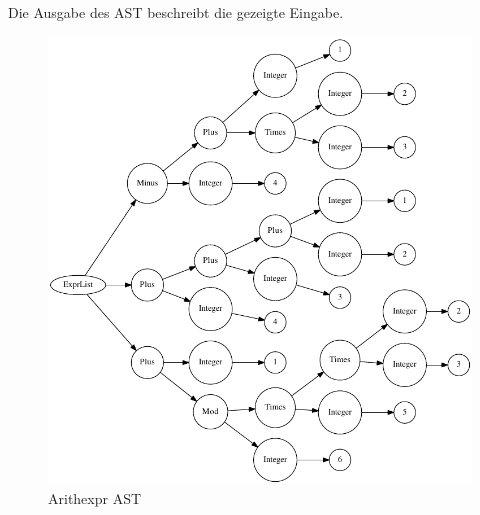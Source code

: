 Die Ausgabe des AST beschreibt die gezeigte Eingabe.
\begin{figure}[!ht]
	\centering
		\includegraphics{arith_expr_tree.pdf}
	\caption{Arithexpr AST}
	\label{fig:arith_expr_tree}
\end{figure}


